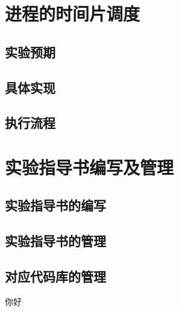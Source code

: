 \section{进程的时间片调度}

\subsection{实验预期}

\subsection{具体实现}

\subsection{执行流程}

\section{实验指导书编写及管理}

\subsection{实验指导书的编写}

\subsection{实验指导书的管理}

\subsection{对应代码库的管理}
你好
